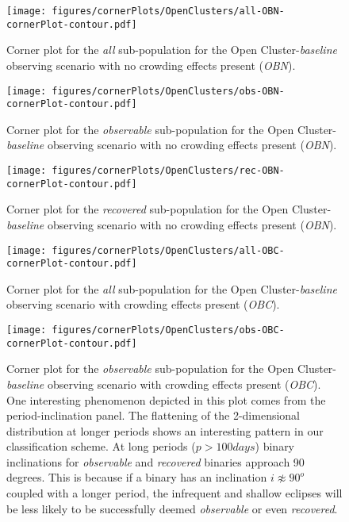 \documentclass[twocolumn]{aastex63}
\begin{document}
\begin{figure}
    \centering
    \texttt{[image: figures/cornerPlots/OpenClusters/all-OBN-cornerPlot-contour.pdf]}
    \caption{Corner plot for the \textit{all} sub-population for the Open Cluster-\textit{baseline} observing scenario with no crowding effects present (\textit{OBN}).}
    \label{fig:obn-all-corner-plot-appendix}
\end{figure}\clearpage

\begin{figure}
    \centering
    \texttt{[image: figures/cornerPlots/OpenClusters/obs-OBN-cornerPlot-contour.pdf]}
    \caption{Corner plot for the \textit{observable} sub-population for the Open Cluster-\textit{baseline} observing scenario with no crowding effects present (\textit{OBN}).}
    \label{fig:obn-obs-corner-plot-appendix}
\end{figure}\clearpage

\begin{figure}
    \centering
    \texttt{[image: figures/cornerPlots/OpenClusters/rec-OBN-cornerPlot-contour.pdf]}
    \caption{Corner plot for the \textit{recovered} sub-population for the Open Cluster-\textit{baseline} observing scenario with no crowding effects present (\textit{OBN}).}
    \label{fig:obn-rec-corner-plot-appendix}
\end{figure}\clearpage

\begin{figure}
    \centering
    \texttt{[image: figures/cornerPlots/OpenClusters/all-OBC-cornerPlot-contour.pdf]}
    \caption{Corner plot for the \textit{all} sub-population for the Open Cluster-\textit{baseline} observing scenario with crowding effects present (\textit{OBC}).}
    \label{fig:obc-all-corner-plot-appendix}
\end{figure}\clearpage

\begin{figure}
    \centering
    \texttt{[image: figures/cornerPlots/OpenClusters/obs-OBC-cornerPlot-contour.pdf]}
    \caption{Corner plot for the \textit{observable} sub-population for the Open Cluster-\textit{baseline} observing scenario with crowding effects present (\textit{OBC}). One interesting phenomenon depicted in this plot comes from the period-inclination panel. The flattening of the 2-dimensional distribution at longer periods shows an interesting pattern in our classification scheme. At long periods ($p > 100 days$) binary inclinations for \textit{observable} and \textit{recovered} binaries approach 90 degrees. This is because if a binary has an inclination $i \not\approx 90^o$ coupled with a longer period, the infrequent and shallow eclipses will be less likely to be successfully deemed \textit{observable} or even \textit{recovered}.}
    \label{fig:obc-obs-corner-plot-appendix}
\end{figure}\clearpage
\end{document}
